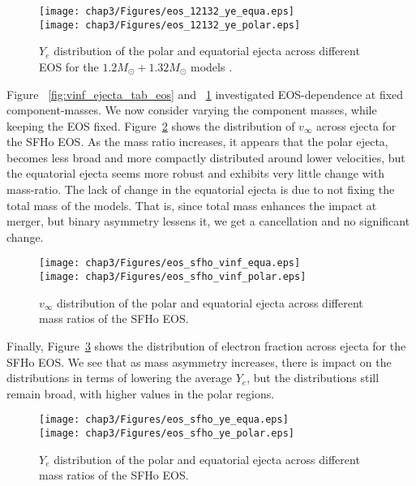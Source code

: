   \begin{figure}[!htbp]
  \texttt{[image: chap3/Figures/eos\_12132\_ye\_equa.eps]}\\
  \texttt{[image: chap3/Figures/eos\_12132\_ye\_polar.eps]}
\caption{
   $Y_e$ distribution of the polar and equatorial ejecta across different EOS for the $1.2M_\odot + 1.32M_\odot$ models .
}
\label{fig:ye_ejecta_tab_eos}
\end{figure}

Figure ~\ref{fig:vinf_ejecta_tab_eos} and ~\ref{fig:ye_ejecta_tab_eos} investigated EOS-dependence at fixed component-masses. We now consider varying the component masses, while keeping the EOS fixed. Figure~\ref{fig:vinf_ejecta_tab_sfho} shows the distribution of $v_\infty$ across ejecta for the SFHo EOS. As the mass ratio increases, it appears that the polar ejecta, becomes less broad and more compactly distributed around lower velocities, but the equatorial ejecta seems more robust and exhibits very little change with mass-ratio. The lack of change in the equatorial ejecta is due to not fixing the total mass of the models. That is, since total mass enhances the impact at merger, but binary asymmetry lessens it, we get a cancellation and no significant change.

\begin{figure}[!htbp]
  \texttt{[image: chap3/Figures/eos\_sfho\_vinf\_equa.eps]}\\
  \texttt{[image: chap3/Figures/eos\_sfho\_vinf\_polar.eps]}
\caption{
   $v_\infty$ distribution of the polar and equatorial ejecta across different mass ratios of the SFHo EOS.
}
\label{fig:vinf_ejecta_tab_sfho}
\end{figure}

Finally, Figure~\ref{fig:ye_ejecta_tab_sfho} shows the distribution of electron fraction across ejecta for the SFHo EOS. We see that as mass asymmetry increases, there is impact on the distributions in terms of lowering the average $Y_e$, but the distributions still remain broad, with higher values in the polar regions.

\begin{figure}[!htbp]
     \texttt{[image: chap3/Figures/eos\_sfho\_ye\_equa.eps]}\\
 \texttt{[image: chap3/Figures/eos\_sfho\_ye\_polar.eps]}
\caption{
   $Y_e$ distribution of the polar and equatorial ejecta across different mass ratios of the SFHo EOS.
}
\label{fig:ye_ejecta_tab_sfho}
\end{figure}



